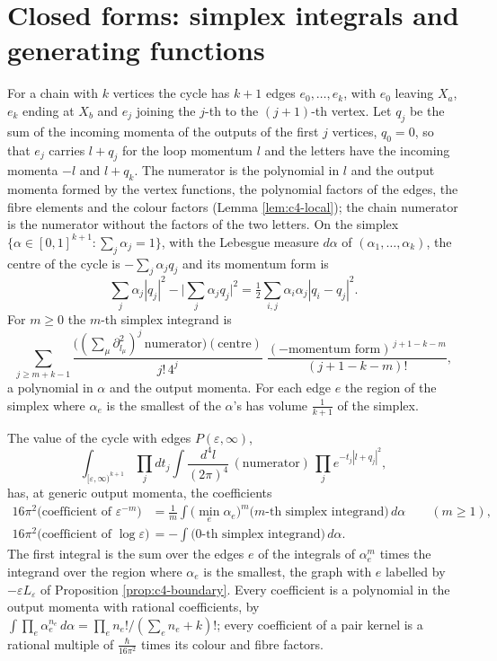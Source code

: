 \section{Closed forms: simplex integrals and generating functions}

\begin{definition}
\label{def:c10-cycle}
For a chain with $k$ vertices the cycle has $k+1$ edges $e_0,\dots,e_k$, with $e_0$ leaving $X_a$, $e_k$ ending at $X_b$ and $e_j$ joining the $j$-th to the $(j+1)$-th vertex. Let $q_j$ be the sum of the incoming momenta of the outputs of the first $j$ vertices, $q_0=0$, so that $e_j$ carries $l+q_j$ for the loop momentum $l$ and the letters have the incoming momenta $-l$ and $l+q_k$. The numerator is the polynomial in $l$ and the output momenta formed by the vertex functions, the polynomial factors of the edges, the fibre elements and the colour factors (Lemma \ref{lem:c4-local}); the chain numerator is the numerator without the factors of the two letters. On the simplex $\{\alpha\in[0,1]^{k+1}:\sum_j\alpha_j=1\}$, with the Lebesgue measure $d\alpha$ of $(\alpha_1,\dots,\alpha_k)$, the centre of the cycle is $-\sum_j\alpha_jq_j$ and its momentum form is
\[
\sum_j\alpha_j|q_j|^2-\Big|\sum_j\alpha_jq_j\Big|^2=\tfrac12\sum_{i,j}\alpha_i\alpha_j|q_i-q_j|^2 .
\]
For $m\ge0$ the $m$-th simplex integrand is
\[
\sum_{j\ge m+k-1}\frac{\big((\textstyle\sum_\mu\partial^2_{l_\mu})^j\,\text{numerator}\big)(\text{centre})}{j!\,4^j}\;\frac{(-\text{momentum form})^{\,j+1-k-m}}{(j+1-k-m)!},
\]
a polynomial in $\alpha$ and the output momenta. For each edge $e$ the region of the simplex where $\alpha_e$ is the smallest of the $\alpha$'s has volume $\frac1{k+1}$ of the simplex.
\end{definition}

\begin{theorem}
\label{thm:c10-simplex}
The value of the cycle with edges $P(\varepsilon,\infty)$,
\[
\int_{[\varepsilon,\infty)^{k+1}}\prod_jdt_j\int\frac{d^4l}{(2\pi)^4}\,(\text{numerator})\,\prod_je^{-t_j|l+q_j|^2},
\]
has, at generic output momenta, the coefficients
\begin{equation}
\begin{aligned}
16\pi^2\big(\text{coefficient of }\varepsilon^{-m}\big)&=\frac1m\int\big(\min_e\alpha_e\big)^m\big(m\text{-th simplex integrand}\big)\,d\alpha\qquad(m\ge1),\\
16\pi^2\big(\text{coefficient of }\log\varepsilon\big)&=-\int\big(0\text{-th simplex integrand}\big)\,d\alpha .
\end{aligned}
\label{eq:c10-simplex}
\end{equation}
The first integral is the sum over the edges $e$ of the integrals of $\alpha_e^m$ times the integrand over the region where $\alpha_e$ is the smallest, the graph with $e$ labelled by $-\varepsilon L_\varepsilon$ of Proposition \ref{prop:c4-boundary}. Every coefficient is a polynomial in the output momenta with rational coefficients, by $\int\prod_e\alpha_e^{n_e}\,d\alpha=\prod_en_e!/(\sum_en_e+k)!$; every coefficient of a pair kernel is a rational multiple of $\frac{\hbar}{16\pi^2}$ times its colour and fibre factors.
\end{theorem}

